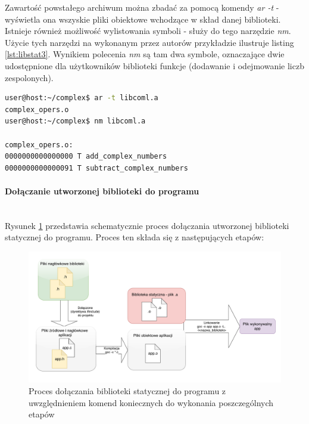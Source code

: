 Zawartość powstałego archiwum można zbadać za pomocą komendy \textit{ar -t} - wyświetla ona wszyskie pliki obiektowe wchodzące w skład danej biblioteki. Istnieje również możliwość wylistowania symboli - służy do tego narzędzie \textit{nm}. Użycie tych narzędzi na wykonanym przez autorów przykładzie ilustruje listing \ref{lst:libstat3}. Wynikiem polecenia \textit{nm} są tam dwa symbole, oznaczające dwie udostępnione dla użytkowników biblioteki funkcje (dodawanie i odejmowanie liczb zespolonych).

\begin{lstlisting}[language=bash, caption={Użycie poleceń \textit{ar -t} oraz \textit{nm} na bibliotece statycznej.},label={lst:libstat3}]
user@host:~/complex$ ar -t libcoml.a
complex_opers.o
user@host:~/complex$ nm libcoml.a

complex_opers.o:
0000000000000000 T add_complex_numbers
0000000000000091 T subtract_complex_numbers
\end{lstlisting}


\paragraph*{Dołączanie utworzonej biblioteki do programu}\mbox{}\\
Rysunek \ref{fig:staticliblink} przedstawia schematycznie proces dołączania utworzonej biblioteki statycznej do programu. Proces ten składa się z następujących etapów:

\begin{figure}[H]
\centering
\caption{Proces dołączania biblioteki statycznej do programu z uwzględnieniem komend koniecznych do wykonania poszczególnych etapów}
\label{fig:staticliblink}
\includegraphics[width=\textwidth]{images/StaticLibLink}
\end{figure}

